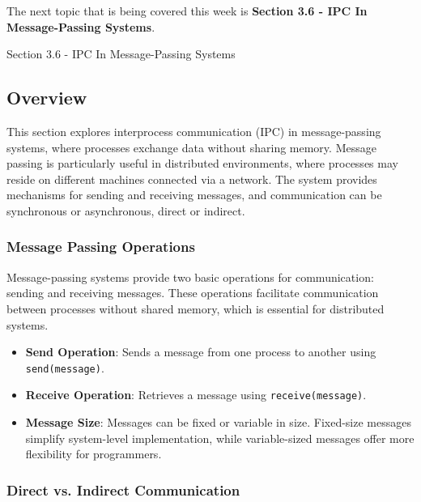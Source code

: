 The next topic that is being covered this week is \textbf{Section 3.6 - IPC In Message-Passing Systems}.

\begin{notes}{Section 3.6 - IPC In Message-Passing Systems}
    \subsection*{Overview}

    This section explores interprocess communication (IPC) in message-passing systems, where processes exchange data without sharing memory. Message passing is particularly useful in distributed environments, 
    where processes may reside on different machines connected via a network. The system provides mechanisms for sending and receiving messages, and communication can be synchronous or asynchronous, direct or indirect.
    
    \subsubsection*{Message Passing Operations}
    
    Message-passing systems provide two basic operations for communication: sending and receiving messages. These operations facilitate communication between processes without shared memory, which is 
    essential for distributed systems.
    
    \begin{highlight}
    
        \begin{itemize}
            \item \textbf{Send Operation}: Sends a message from one process to another using \texttt{send(message)}.
            \item \textbf{Receive Operation}: Retrieves a message using \texttt{receive(message)}.
            \item \textbf{Message Size}: Messages can be fixed or variable in size. Fixed-size messages simplify system-level implementation, while variable-sized messages offer more flexibility for programmers.
        \end{itemize}
    
    \end{highlight}
    
    \subsubsection*{Direct vs. Indirect Communication}
    

\end{notes}
